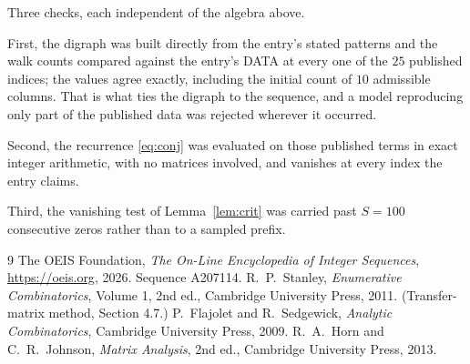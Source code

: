 \documentclass[11pt,a4paper]{article}
\theoremstyle{plain}
\theoremstyle{definition}
\begin{document}
Three checks, each independent of the algebra above.

First, the digraph was built directly from the entry's stated patterns and the walk counts
compared against the entry's DATA at every one of the $25$ published indices; the
values agree exactly, including the initial count of $10$ admissible columns. That is
what ties the digraph to the sequence, and a model reproducing only part of the published
data was rejected wherever it occurred.

Second, the recurrence \eqref{eq:conj} was evaluated on those published terms in exact
integer arithmetic, with no matrices involved, and vanishes at every index the entry claims.

Third, the vanishing test of Lemma~\ref{lem:crit} was carried past $S=100$ consecutive
zeros rather than to a sampled prefix.

\begin{thebibliography}{9}
 The OEIS Foundation, \emph{The On-Line Encyclopedia of Integer
Sequences}, \url{https://oeis.org}, 2026. Sequence A207114.
 R.~P.~Stanley, \emph{Enumerative Combinatorics}, Volume 1, 2nd ed.,
Cambridge University Press, 2011. (Transfer-matrix method, Section 4.7.)
 P.~Flajolet and R.~Sedgewick, \emph{Analytic Combinatorics}, Cambridge
University Press, 2009.
 R.~A.~Horn and C.~R.~Johnson, \emph{Matrix Analysis}, 2nd ed., Cambridge
University Press, 2013.
\end{thebibliography}
\end{document}
